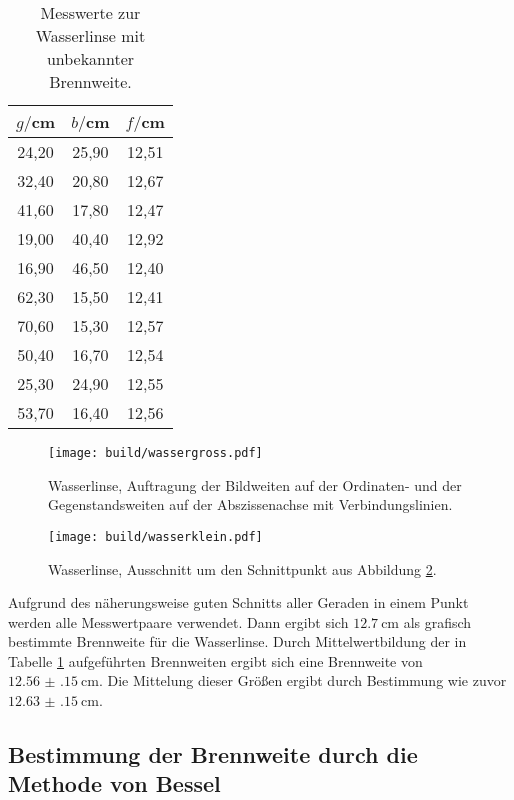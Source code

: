 \begin{table}[htp]
	\begin{center}
    \caption{Messwerte zur Wasserlinse  mit unbekannter Brennweite.}
    \label{tab:unbekannt}
		\begin{tabular}{ccc}
		\toprule
			{$g/$cm} & {$b/$cm} & {$f/$cm}\\
			\midrule
			24,20 & 25,90 & 12,51\\
			32,40 & 20,80 & 12,67\\
			41,60 & 17,80 & 12,47\\
			19,00 & 40,40 & 12,92\\
			16,90 & 46,50 & 12,40\\
			62,30 & 15,50 & 12,41\\
			70,60 & 15,30 & 12,57\\
			50,40 & 16,70 & 12,54\\
			25,30 & 24,90 & 12,55\\
			53,70 & 16,40 & 12,56\\
		\bottomrule
		\end{tabular}
	\end{center}
\end{table}

\begin{figure}%
  \centering
  \texttt{[image: build/wassergross.pdf]}
  \caption{Wasserlinse, Auftragung der Bildweiten auf der Ordinaten- und der Gegenstandsweiten auf der Abszissenachse mit Verbindungslinien.}
  \label{fig:wassergross}
\end{figure}

\begin{figure}%
  \centering
  \texttt{[image: build/wasserklein.pdf]}
  \caption{Wasserlinse, Ausschnitt um den Schnittpunkt aus Abbildung \ref{fig:wasserklein}.}
  \label{fig:wasserklein}
\end{figure}

Aufgrund des näherungsweise guten Schnitts aller Geraden in einem Punkt werden alle
Messwertpaare verwendet. Dann ergibt sich $\SI{12.7}{\centi\meter}$ als grafisch bestimmte
Brennweite für die Wasserlinse. Durch Mittelwertbildung der in Tabelle \ref{tab:unbekannt}
aufgeführten Brennweiten ergibt sich eine Brennweite von $\SI{12.56(15)}{\centi\meter}$.
Die Mittelung dieser Größen ergibt durch Bestimmung wie zuvor $\SI{12.63(15)}{\centi\meter}$.

\subsection{Bestimmung der Brennweite durch die Methode von Bessel}

